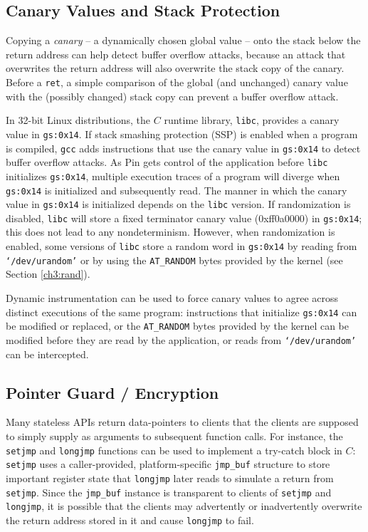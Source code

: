 \subsection{Canary Values and Stack Protection}
Copying a \emph{canary} -- a dynamically chosen global value -- onto the stack below the return
address can help detect buffer overflow attacks, because 
an attack that overwrites the return address will also overwrite
the stack copy of the canary. Before a \texttt{ret}, a simple comparison of the global (and unchanged) canary
value with the (possibly changed) stack copy can prevent a buffer overflow attack.

In 32-bit Linux distributions, the $C$ runtime library, 
\texttt{libc}, provides a canary value in \texttt{gs:0x14}.
If stack smashing protection (SSP) is enabled when a program is compiled,
\texttt{gcc} adds instructions that use the canary value
in \texttt{gs:0x14} to detect buffer overflow attacks.
As Pin gets control of the application before \texttt{libc}
initializes \texttt{gs:0x14}, multiple execution traces of a program
will diverge when \texttt{gs:0x14} is initialized and subsequently
read.  The manner in which the canary value in \texttt{gs:0x14} is initialized
depends on the \texttt{libc} version.
If randomization is disabled, \texttt{libc} will store a fixed terminator canary value (0xff0a0000)
in \texttt{gs:0x14}; this does not lead to any nondeterminism.
However, when randomization is enabled, 
some versions of \texttt{libc} store a random word in \texttt{gs:0x14} by reading from \texttt{`/dev/urandom'}
or by using the \texttt{AT\_RANDOM} bytes provided by the kernel (see Section \ref{ch3:rand}). 

Dynamic instrumentation can be used to force canary values
to agree across distinct executions of the same program:
instructions that initialize \texttt{gs:0x14} can be
modified or replaced, or the \texttt{AT\_RANDOM} bytes provided by the kernel can be
modified before they are read by the application, or reads from \texttt{`/dev/urandom'} can be 
intercepted.

\subsection{Pointer Guard / Encryption}
Many stateless APIs return data-pointers to clients 
that the clients are supposed to simply supply as arguments
to subsequent function calls. 
For instance, the \texttt{setjmp} and \texttt{longjmp} functions
can be used to implement a try-catch block in $C$: \texttt{setjmp} uses 
a caller-provided, platform-specific \texttt{jmp\_buf} structure
to store important register state that \texttt{longjmp} later reads to simulate a return from \texttt{setjmp}.
Since the \texttt{jmp\_buf} instance is transparent to clients of \texttt{setjmp}
and \texttt{longjmp}, it is possible that the clients may advertently or inadvertently
overwrite the return address stored in it and cause
\texttt{longjmp} to fail.

